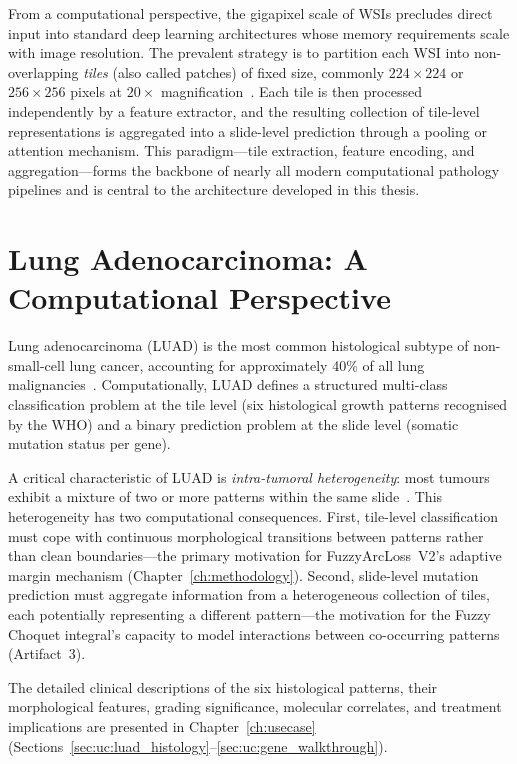 From a computational perspective, the gigapixel scale of WSIs precludes direct input into standard deep learning architectures whose memory requirements scale with image resolution.
The prevalent strategy is to partition each WSI into non-overlapping \emph{tiles} (also called patches) of fixed size, commonly $224 \times 224$ or $256 \times 256$ pixels at $20\times$ magnification~\cite{lu2021data,chen2024uni}.
Each tile is then processed independently by a feature extractor, and the resulting collection of tile-level representations is aggregated into a slide-level prediction through a pooling or attention mechanism.
This paradigm---tile extraction, feature encoding, and aggregation---forms the backbone of nearly all modern computational pathology pipelines and is central to the architecture developed in this thesis.


\section{Lung Adenocarcinoma: A Computational Perspective}
\label{sec:bg:luad}

Lung adenocarcinoma (LUAD) is the most common histological subtype of non-small-cell lung cancer, accounting for approximately 40\% of all lung malignancies~\cite{who2021thoracic}.
Computationally, LUAD defines a structured multi-class classification problem at the tile level (six histological growth patterns recognised by the WHO) and a binary prediction problem at the slide level (somatic mutation status per gene).

A critical characteristic of LUAD is \emph{intra-tumoral heterogeneity}: most tumours exhibit a mixture of two or more patterns within the same slide~\cite{warth2012interobserver}.
This heterogeneity has two computational consequences.
First, tile-level classification must cope with continuous morphological transitions between patterns rather than clean boundaries---the primary motivation for FuzzyArcLoss~V2's adaptive margin mechanism (Chapter~\ref{ch:methodology}).
Second, slide-level mutation prediction must aggregate information from a heterogeneous collection of tiles, each potentially representing a different pattern---the motivation for the Fuzzy Choquet integral's capacity to model interactions between co-occurring patterns (Artifact~3).

The detailed clinical descriptions of the six histological patterns, their morphological features, grading significance, molecular correlates, and treatment implications are presented in Chapter~\ref{ch:usecase} (Sections~\ref{sec:uc:luad_histology}--\ref{sec:uc:gene_walkthrough}).


